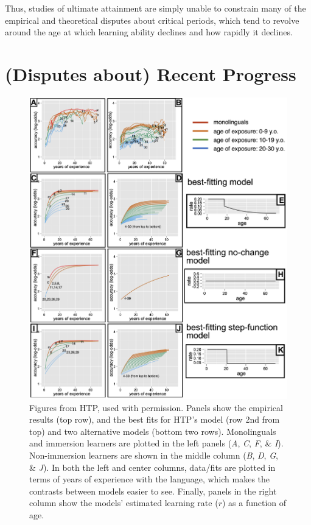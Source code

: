 \documentclass[
  english,
  doc,floatsintext]{apa6}
\begin{document}
Thus, studies of ultimate attainment are simply unable to constrain many of the empirical and theoretical disputes about critical periods, which tend to revolve around the age at which learning ability declines and how rapidly it declines.

\hypertarget{disputes-about-recent-progress}{%
\section{(Disputes about) Recent Progress}\label{disputes-about-recent-progress}}



\begin{figure}
\includegraphics[width=1\linewidth,height=1\textheight]{Figures/Figure4} \caption{Figures from HTP, used with permission. Panels show the empirical results (top row), and the best fits for HTP's model (row 2nd from top) and two alternative models (bottom two rows). Monolinguals and immersion learners are plotted in the left panels (\emph{A}, \emph{C}, \emph{F}, \& \emph{I}). Non-immersion learners are shown in the middle column (\emph{B}, \emph{D}, \emph{G}, \& \emph{J}). In both the left and center columns, data/fits are plotted in terms of years of experience with the language, which makes the contrasts between models easier to see. Finally, panels in the right column show the models' estimated learning rate (\(r\)) as a function of age.}\label{fig:HTP}
\end{figure}
\end{document}
